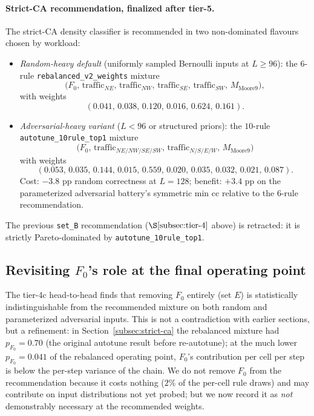 \documentclass[11pt,a4paper]{article}
\begin{document}
\paragraph{Strict-CA recommendation, finalized after tier-5.}
{\sloppy
The strict-CA density classifier is recommended in two
non-dominated flavours chosen by workload:
\begin{itemize}
\item \emph{Random-heavy default} (uniformly sampled Bernoulli
  inputs at \(L \geq 96\)): the \(6\)-rule
  \texttt{rebalanced\_v2\_weights} mixture
  \[
  \bigl(F_0,\,\mathrm{traffic}_{NE},\,\mathrm{traffic}_{NW},\,
         \mathrm{traffic}_{SE},\,\mathrm{traffic}_{SW},\,M_{\mathrm{Moore9}}\bigr),
  \]
  with weights
  \[(0.041,\, 0.038,\, 0.120,\, 0.016,\, 0.624,\, 0.161).\]
\item \emph{Adversarial-heavy variant} (\(L < 96\) or structured
  priors): the \(10\)-rule \texttt{autotune\_10rule\_top1} mixture
  \[
  \bigl(F_0,\,\mathrm{traffic}_{NE/NW/SE/SW},\,
         \mathrm{traffic}_{N/S/E/W},\,M_{\mathrm{Moore9}}\bigr)
  \]
  with weights
  \[
  (0.053,\, 0.035,\, 0.144,\, 0.015,\, 0.559,\,
    0.020,\, 0.035,\, 0.032,\, 0.021,\, 0.087).
  \]
  Cost: \(-3.8\) pp random correctness at \(L=128\); benefit:
  \(+3.4\) pp on the parameterized adversarial battery's
  symmetric min cc relative to the 6-rule recommendation.
\end{itemize}
The previous \texttt{set\_B} recommendation
(\(\S\ref{subsec:tier-4}\) above) is retracted: it is strictly
Pareto-dominated by \texttt{autotune\_10rule\_top1}.
\par}

\subsection{Revisiting \texorpdfstring{$F_0$}{F0}'s role at the
final operating point}
\label{subsec:f0-revisit}

The tier-4c head-to-head finds that removing \(F_0\) entirely (set
\(E\)) is statistically indistinguishable from the recommended
mixture on both random and parameterized adversarial inputs.  This
is not a contradiction with earlier sections, but a refinement: in
Section~\ref{subsec:strict-ca} the rebalanced mixture had
\(p_{F_0} = 0.70\) (the original autotune result before
re-autotune); at the much lower \(p_{F_0} = 0.041\) of the
rebalanced operating point, \(F_0\)'s contribution per cell per step
is below the per-step variance of the chain.  We do not remove
\(F_0\) from the recommendation because it costs nothing (\(2\%\) of
the per-cell rule draws) and may contribute on input distributions
not yet probed; but we now record it as \emph{not} demonstrably
necessary at the recommended weights.
\end{document}
